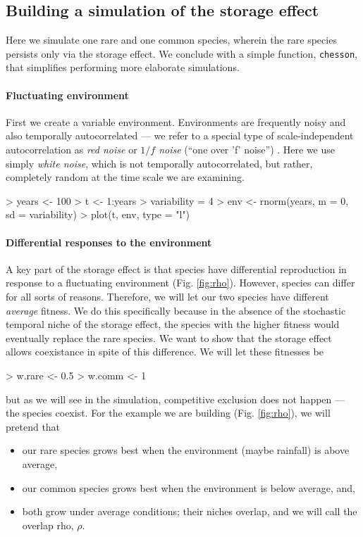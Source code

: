 \subsection{Building a simulation of the storage effect}
Here we simulate one rare and one common species, wherein the rare species persists only via the storage effect. We conclude with a simple function, \texttt{chesson}, that simplifies performing more elaborate simulations.

\paragraph{Fluctuating environment}
First we create a variable environment. Environments are frequently noisy and also temporally autocorrelated --- we refer to a special type of scale-independent autocorrelation as \emph{red noise} or \emph{$1/f$ noise} (``one over 'f' noise'') \cite{Halley1996}. Here we use simply \emph{white noise}, which is not temporally autocorrelated, but rather, completely random at the time scale we are examining.
\begin{Schunk}
\begin{Sinput}
> years <- 100
> t <- 1:years
> variability = 4
> env <- rnorm(years, m = 0, sd = variability)
> plot(t, env, type = "l")
\end{Sinput}
\end{Schunk}
\paragraph{Differential responses to the environment}
A key part of the storage effect is that species have differential reproduction in response to a fluctuating environment  (Fig. \ref{fig:rho}). However, species can differ for all sorts of reasons. Therefore, we will let our two species have different \emph{average} fitness. We do this specifically because in the absence of the stochastic temporal niche of the storage effect, the  species with the higher fitness would eventually replace the rare species. We want to show that the storage effect allows coexistance in spite of this difference. We will let these fitnesses be
\begin{Schunk}
\begin{Sinput}
> w.rare <- 0.5
> w.comm <- 1
\end{Sinput}
\end{Schunk}
but as we will see in the simulation, competitive exclusion does not happen --- the species coexist. For the example we are building  (Fig. \ref{fig:rho}), we will pretend that
\begin{itemize}
\item our rare species grows best when the environment (maybe rainfall) is above average,
  \item our common species grows best when the environment is below average, and,
    \item both grow under average conditions; their niches overlap, and we will call the overlap rho, $\rho$.
\end{itemize}


